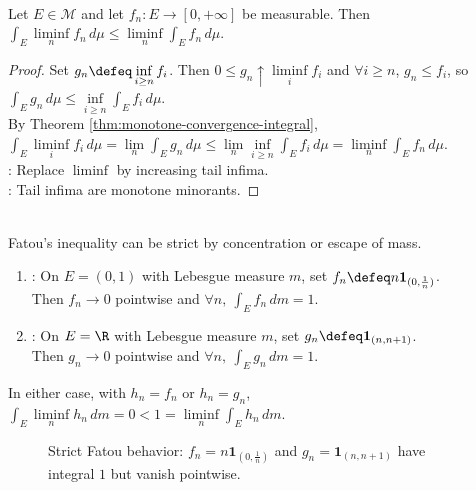 \begin{theorem} \label{thm:fatou-lemma} \\
Let $E\in\mathcal{M}$ and let $f_n:E\to[0,+\infty]$ be measurable. Then $\int_E\liminf\limits_nf_n\,d\mu\leq\liminf\limits_n\int_Ef_n\,d\mu$.
\begin{proof} Set $g_n\defeq\inf\limits_{i\geq n}f_i$. Then $0\leq g_n\uparrow\liminf\limits_if_i$ and $\forall i\geq n$, $g_n\leq f_i$, so $\int_Eg_n\,d\mu\leq\inf\limits_{i\geq n}\int_Ef_i\,d\mu$.\\
By Theorem \ref{thm:monotone-convergence-integral}, $\int_E\liminf\limits_if_i\,d\mu=\lim\limits_n\int_Eg_n\,d\mu\leq\lim\limits_n\inf\limits_{i\geq n}\int_Ef_i\,d\mu=\liminf\limits_n\int_Ef_n\,d\mu$.\\
: Replace $\liminf$ by increasing tail infima.\\
: Tail infima are monotone minorants.
\end{proof}
\end{theorem}

\begin{example} \label{ex:fatou-strict-concentration-and-escape} \\
Fatou's inequality can be strict by concentration or escape of mass.
\begin{enumerate}[label=(\roman*)]
\setlength{\itemsep}{0pt}
\item {}: On $E=(0,1)$ with Lebesgue measure $m$, set $f_n\defeq n\mathbf{1}_{(0,\frac{1}{n})}$.\\
Then $f_n\to0$ pointwise and $\forall n,\ \int_Ef_n\,dm=1$.
\item {}: On $E=\R$ with Lebesgue measure $m$, set $g_n\defeq\mathbf{1}_{(n,n+1)}$.\\
Then $g_n\to0$ pointwise and $\forall n,\ \int_Eg_n\,dm=1$.
\end{enumerate}
In either case, with $h_n=f_n$ or $h_n=g_n$, $\int_E\liminf\limits_nh_n\,dm=0<1=\liminf\limits_n\int_Eh_n\,dm$.
\end{example}

\begin{figure}[H]
  \centering
  
  \caption{Strict Fatou behavior: \textcolor{blue!65!black}{$f_n=n\mathbf{1}_{(0,\frac{1}{n})}$} and \textcolor{green!45!black}{$g_n=\mathbf{1}_{(n,n+1)}$} have integral $1$ but vanish pointwise.}
  \label{fig:fatou-concentration-escape}
\end{figure}

